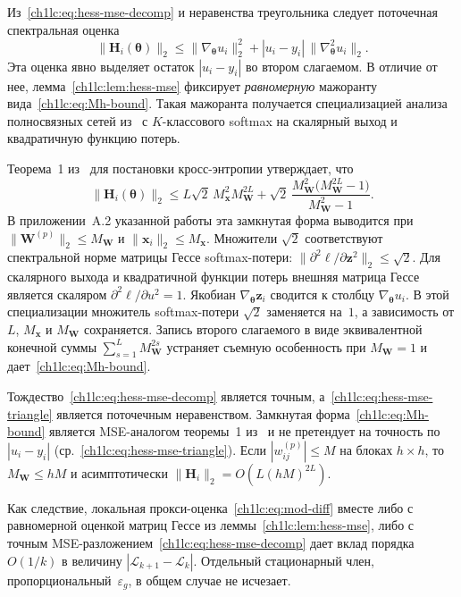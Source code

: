 Из~\eqref{ch1lc:eq:hess-mse-decomp} и неравенства треугольника следует поточечная спектральная оценка
\begin{equation}\label{ch1lc:eq:hess-mse-triangle}
  \bigl\|\mathbf{H}_i(\boldsymbol{\theta})\bigr\|_2
  \le \bigl\|\nabla_{\boldsymbol{\theta}}u_i\bigr\|_2^2
  + |u_i-y_i|\,\bigl\|\nabla_{\boldsymbol{\theta}}^2 u_i\bigr\|_2 .
\end{equation}
Эта оценка явно выделяет остаток $|u_i-y_i|$ во втором слагаемом. В отличие от нее, лемма~\ref{ch1lc:lem:hess-mse} фиксирует \emph{равномерную} мажоранту вида~\eqref{ch1lc:eq:Mh-bound}. Такая мажоранта получается специализацией анализа полносвязных сетей из~\cite[теорема~1 и приложение~A.2]{grabovoi2024unraveling748584228} с $K$-классового softmax на скалярный выход и квадратичную функцию потерь.

Теорема~1 из~\cite{grabovoi2024unraveling748584228} для постановки кросс-энтропии утверждает, что
\[
  \|\mathbf{H}_i(\boldsymbol{\theta})\|_2
  \le L\sqrt{2}\,M_{\mathbf{x}}^2 M_{\mathbf{W}}^{2L}
  + \sqrt{2}\,\frac{M_{\mathbf{W}}^2\bigl(M_{\mathbf{W}}^{2L}-1\bigr)}{M_{\mathbf{W}}^2-1}.
\]
В приложении~A.2 указанной работы эта замкнутая форма выводится при $\|\mathbf{W}^{(p)}\|_2\le M_{\mathbf{W}}$ и $\|\mathbf{x}_i\|_2\le M_{\mathbf{x}}$. Множители $\sqrt{2}$ соответствуют спектральной норме матрицы Гессе softmax-потери: $\|\partial^2\ell/\partial\mathbf{z}^2\|_2\le\sqrt{2}$.
Для скалярного выхода и квадратичной функции потерь внешняя матрица Гессе является скаляром $\partial^2\ell/\partial u^2=1$. Якобиан $\nabla_{\boldsymbol{\theta}}\mathbf{z}_i$ сводится к столбцу $\nabla_{\boldsymbol{\theta}}u_i$. В этой специализации множитель softmax-потери $\sqrt{2}$ заменяется на~$1$, а зависимость от $L$, $M_{\mathbf{x}}$ и $M_{\mathbf{W}}$ сохраняется. Запись второго слагаемого в виде эквивалентной конечной суммы $\sum_{s=1}^{L} M_{\mathbf{W}}^{2s}$ устраняет съемную особенность при $M_{\mathbf{W}}=1$ и дает~\eqref{ch1lc:eq:Mh-bound}.

Тождество~\eqref{ch1lc:eq:hess-mse-decomp} является точным, а~\eqref{ch1lc:eq:hess-mse-triangle} является поточечным неравенством.
Замкнутая форма~\eqref{ch1lc:eq:Mh-bound} является MSE-аналогом теоремы~1 из~\cite{grabovoi2024unraveling748584228} и не претендует на точность по $|u_i-y_i|$ (ср.~\eqref{ch1lc:eq:hess-mse-triangle}).
Если $|w_{ij}^{(p)}|\le M$ на блоках $h\times h$, то $M_{\mathbf{W}}\le hM$ и асимптотически $\|\mathbf{H}_i\|_2=O(L(hM)^{2L})$.


Как следствие, локальная прокси-оценка~\eqref{ch1lc:eq:mod-diff} вместе либо с равномерной оценкой матриц Гессе из леммы~\ref{ch1lc:lem:hess-mse}, либо с точным MSE-разложением~\eqref{ch1lc:eq:hess-mse-decomp} дает вклад порядка $O(1/k)$ в величину $|\mathcal{L}_{k+1}-\mathcal{L}_k|$. Отдельный стационарный член, пропорциональный~$\varepsilon_g$, в общем случае не исчезает.

